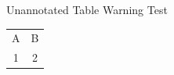 \documentclass[14pt,t]{beamer-accessibility}
\begin{document}
\begin{frame}{Unannotated Table Warning Test}
\begin{tabular}{cc}
A & B \\
1 & 2 \\
\end{tabular}
\end{frame}
\end{document}
